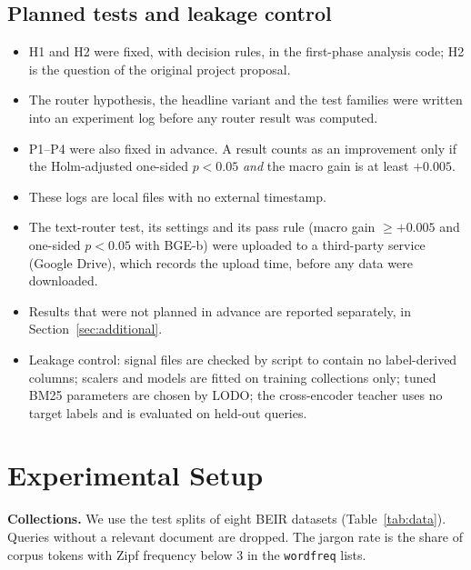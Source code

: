 \documentclass[conference]{IEEEtran}
\begin{document}
\subsection{Planned tests and leakage control}
\begin{itemize}
\item H1 and H2 were fixed, with decision rules, in the first-phase analysis code; H2 is the question of the original project proposal.
\item The router hypothesis, the headline variant and the test families were written into an experiment log before any router result was computed.
\item P1--P4 were also fixed in advance. A result counts as an improvement only if the Holm-adjusted one-sided $p<0.05$ \emph{and} the macro gain is at least $+0.005$.
\item These logs are local files with no external timestamp.
\item The text-router test, its settings and its pass rule (macro gain $\geq+0.005$ and one-sided $p<0.05$ with BGE-b) were uploaded to a third-party service (Google Drive), which records the upload time, before any data were downloaded.
\item Results that were not planned in advance are reported separately, in Section~\ref{sec:additional}.
\item Leakage control: signal files are checked by script to contain no label-derived columns; scalers and models are fitted on training collections only; tuned BM25 parameters are chosen by LODO; the cross-encoder teacher uses no target labels and is evaluated on held-out queries.
\end{itemize}

\section{Experimental Setup}
\label{sec:setup}
\textbf{Collections.} We use the test splits of eight BEIR datasets (Table~\ref{tab:data}). Queries without a relevant document are dropped. The jargon rate is the share of corpus tokens with Zipf frequency below 3 in the \texttt{wordfreq} lists.
\end{document}
